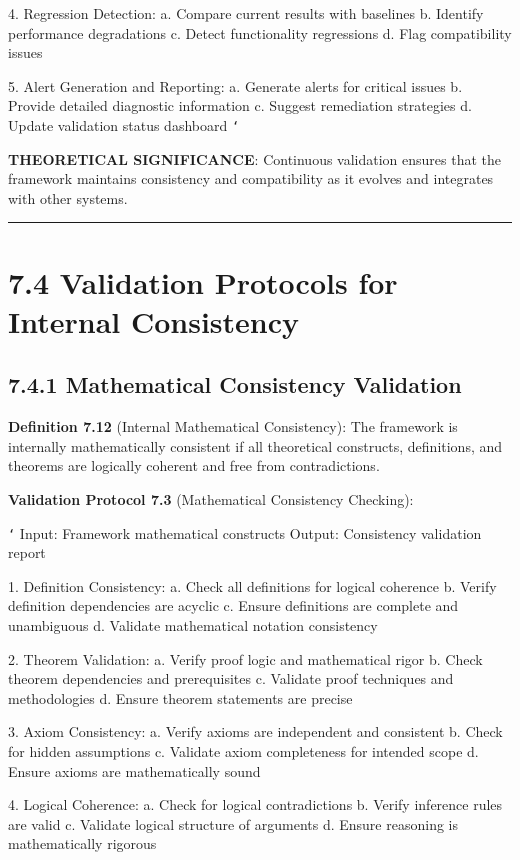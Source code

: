 4. Regression Detection:
   a. Compare current results with baselines
   b. Identify performance degradations
   c. Detect functionality regressions
   d. Flag compatibility issues
   
5. Alert Generation and Reporting:
   a. Generate alerts for critical issues
   b. Provide detailed diagnostic information
   c. Suggest remediation strategies
   d. Update validation status dashboard
\texttt{`}

\textbf{THEORETICAL SIGNIFICANCE}: Continuous validation ensures that the framework maintains consistency and compatibility as it evolves and integrates with other systems.

\hrule

\section{7.4 Validation Protocols for Internal Consistency}

\subsection{7.4.1 Mathematical Consistency Validation}

\textbf{Definition 7.12} (Internal Mathematical Consistency): The framework is internally mathematically consistent if all theoretical constructs, definitions, and theorems are logically coherent and free from contradictions.

\textbf{Validation Protocol 7.3} (Mathematical Consistency Checking):

\texttt{`}
Input: Framework mathematical constructs
Output: Consistency validation report

1. Definition Consistency:
   a. Check all definitions for logical coherence
   b. Verify definition dependencies are acyclic
   c. Ensure definitions are complete and unambiguous
   d. Validate mathematical notation consistency
   
2. Theorem Validation:
   a. Verify proof logic and mathematical rigor
   b. Check theorem dependencies and prerequisites
   c. Validate proof techniques and methodologies
   d. Ensure theorem statements are precise
   
3. Axiom Consistency:
   a. Verify axioms are independent and consistent
   b. Check for hidden assumptions
   c. Validate axiom completeness for intended scope
   d. Ensure axioms are mathematically sound
   
4. Logical Coherence:
   a. Check for logical contradictions
   b. Verify inference rules are valid
   c. Validate logical structure of arguments
   d. Ensure reasoning is mathematically rigorous
   
